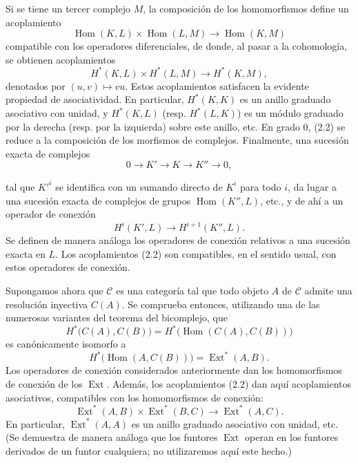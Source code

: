 \documentclass[11pt,twoside,openany]{book}
\numberwithin{equation}{section}
\newcommand{\src}[1]{%
  \phantomsection\hypertarget{src:#1}{}%
  \marginpar{\raggedleft\footnotesize\sffamily #1}%
}
\newcommand{\Ccat}{\mathcal C}
\theoremstyle{plain}
\theoremstyle{definition}
\theoremstyle{remark}
\newcommand{\FgaUnitKey}{frontmatter}
\renewcommand{\src}[1]{%
  \phantomsection\hypertarget{src:\FgaUnitKey:#1}{}%
  \marginpar{\raggedleft\footnotesize\sffamily #1}%
}
\theoremstyle{plain}
\theoremstyle{definition}
\theoremstyle{remark}
\begin{document}
Si se tiene un tercer complejo $M$, la composición de los homomorfismos
define un acoplamiento
\[
  \operatorname{Hom}(K,L)\times\operatorname{Hom}(L,M)
  \longrightarrow\operatorname{Hom}(K,M)
\]
compatible con los operadores diferenciales, de donde, al pasar a la cohomología,
se obtienen acoplamientos
\begin{equation}\tag{2.2}
  H^{*}(K,L)\times H^{*}(L,M)\longrightarrow H^{*}(K,M),
\end{equation}
denotados por $(u,v)\longmapsto vu$. Estos acoplamientos satisfacen la evidente propiedad
de asociatividad. En particular, $H^{*}(K,K)$ es un anillo graduado asociativo
con unidad, y $H^{*}(K,L)$ (resp. $H^{*}(L,K)$) es un módulo graduado por la derecha
(resp. por la izquierda) sobre este anillo, etc. En grado $0$, (2.2) se reduce a la
composición de los morfismos de complejos. Finalmente, una sucesión exacta de
complejos
\[
  0\longrightarrow K'\longrightarrow K\longrightarrow K''\longrightarrow 0,
\]
\src{172}
tal que $K'^{i}$ se identifica con un sumando directo de $K^{i}$ para todo $i$,
da lugar a una sucesión exacta de complejos de grupos
$\operatorname{Hom}(K'',L)$, etc., y de ahí a un operador de conexión
\[
  H^{i}(K',L)\longrightarrow H^{i+1}(K'',L).
\]
Se definen de manera análoga los operadores de conexión relativos a una sucesión exacta en $L$. Los
acoplamientos (2.2) son compatibles, en el sentido usual, con estos operadores de conexión.

Supongamos ahora que $\Ccat$ es una categoría tal que todo objeto $A$
de $\Ccat$ admite una resolución inyectiva $C(A)$. Se comprueba entonces, utilizando
una de las numerosas variantes del teorema del bicomplejo, que
\[
  H^{*}\bigl(C(A),C(B)\bigr)
  =H^{*}\bigl(\operatorname{Hom}(C(A),C(B))\bigr)
\]
es canónicamente isomorfo a
\[
  H^{*}\bigl(\operatorname{Hom}(A,C(B))\bigr)
  =\operatorname{Ext}^{*}(A,B).
\]
Los operadores de conexión considerados anteriormente dan los homomorfismos de conexión de los
$\operatorname{Ext}$. Además, los acoplamientos (2.2) dan aquí
acoplamientos asociativos, compatibles con los homomorfismos de conexión:
\begin{equation}\tag{2.3}
  \operatorname{Ext}^{*}(A,B)\times\operatorname{Ext}^{*}(B,C)
  \longrightarrow\operatorname{Ext}^{*}(A,C).
\end{equation}
En particular, $\operatorname{Ext}^{*}(A,A)$ es un anillo graduado asociativo
con unidad, etc. (Se demuestra de manera análoga que los funtores
$\operatorname{Ext}$ operan en los funtores derivados de un funtor
cualquiera; no utilizaremos aquí este hecho.)
\end{document}
